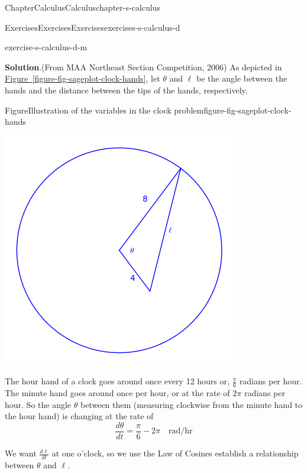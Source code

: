 \documentclass[oneside,10pt,]{book}
\newcommand{\blocktitlefont}{\relax}
\newcommand{\xreffont}{\relax}
\numberwithin{equation}{section}
\begin{document}
\begin{chapterptx}{Chapter}{Calculus}{}{Calculus}{}{}{chapter-s-calculus}
\begin{exercises-section}{Exercises}{Exercises}{}{Exercises}{}{}{exercises-s-calculus-d}
\begin{divisionexercise}{12}{}{}{exercise-s-calculus-d-m}
\par\smallskip%
\noindent\textbf{\blocktitlefont Solution}.\hypertarget{solution-s-calculus-d-m-b}{}\quad{}(From MAA Northeast Section Competition, 2006) As depicted in \hyperref[figure-fig-sageplot-clock-hands]{Figure~{\xreffont\ref{figure-fig-sageplot-clock-hands}}}, let \(\theta\) and \(\ell\) be the angle between the hands and the distance between the tips of the hands, respectively.%
\begin{figureptx}{Figure}{Illustration of the variables in the clock problem}{figure-fig-sageplot-clock-hands}{}%
\begin{image}{0}{1}{0}%
\includegraphics[width=\linewidth]{images/sageplot-clock-hands.png}
\end{image}%
\tcblower
\end{figureptx}%
The hour hand of a clock goes around once every 12 hours or, \(\frac{\pi}{6}\) radians per hour. The minute hand goes around once per hour, or at the rate of \(2 \pi\)  radians per hour. So the angle \(\theta\) between them (measuring clockwise from the minute hand to the hour hand) is changing at the rate of%
\begin{equation*}
\frac{d\theta}{dt} = \frac{\pi}{6}-2\pi \quad \textrm{rad/hr} 
\end{equation*}
%
\par
We want \(\frac{d\ell}{dt}\) at one o'clock, so we use the Law of Cosines establish a relationship between \(\theta\) and \(\ell\).%

\end{divisionexercise}
\end{exercises-section}
\end{chapterptx}
\end{document}
